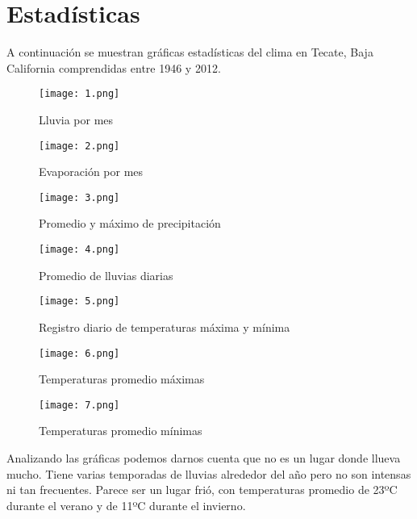 \documentclass{article}
\begin{document}
\section{Estadísticas}
A continuación se muestran gráficas estadísticas del clima en Tecate, Baja California comprendidas entre 1946 y 2012.

\begin{figure}[H]
    \centering
    \texttt{[image: 1.png]}
    \caption{Lluvia por mes}
    \label{fig:my_label}
\end{figure}

\begin{figure}[H]
    \centering
    \texttt{[image: 2.png]}
    \caption{Evaporación por mes}
    \label{fig:my_label}
\end{figure}

\begin{figure}[H]
    \centering
    \texttt{[image: 3.png]}
    \caption{Promedio y máximo de precipitación}
    \label{fig:my_label}
\end{figure}

\begin{figure}[H]
    \centering
    \texttt{[image: 4.png]}
    \caption{Promedio de lluvias diarias}
    \label{fig:my_label}
\end{figure}

\begin{figure}[H]
    \centering
    \texttt{[image: 5.png]}
    \caption{Registro diario de temperaturas máxima y mínima}
    \label{fig:my_label}
\end{figure}

\begin{figure}[H]
    \centering
    \texttt{[image: 6.png]}
    \caption{Temperaturas promedio máximas}
    \label{fig:my_label}
\end{figure}

\begin{figure}[H]
    \centering
    \texttt{[image: 7.png]}
    \caption{Temperaturas promedio mínimas}
    \label{fig:my_label}
\end{figure}

Analizando las gráficas podemos darnos cuenta que no es un lugar donde llueva mucho. Tiene varias temporadas de lluvias alrededor del año pero no son intensas ni tan frecuentes. Parece ser un lugar frió, con temperaturas promedio de 23ºC durante el verano y de 11ºC durante el invierno.
\end{document}
